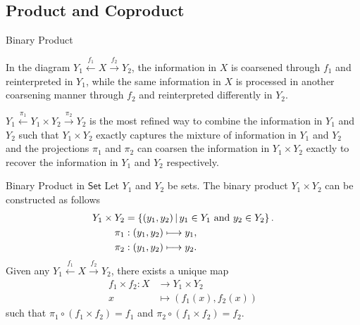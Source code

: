 \subsection{Product and Coproduct}
\begin{definition}{Binary Product}{}
    \begin{center}
    \end{center}
\end{definition}

In the diagram $Y_1\xleftarrow{f_1} X \xrightarrow{f_2} Y_2$, the information in $X$ is coarsened through $f_1$ and reinterpreted in $Y_1$, while the same information in $X$ is processed in another coarsening manner through $f_2$ and reinterpreted differently in $Y_2$.

$Y_1\xleftarrow{\pi_1}Y_1\times Y_2 \xrightarrow{\pi_2} Y_2$ is the most refined way to combine the information in $Y_1$ and $Y_2$ such that $Y_1\times Y_2$ exactly captures the mixture of information in $Y_1$ and $Y_2$ and the projections $\pi_1$ and $\pi_2$ can coarsen the information in $Y_1\times Y_2$ exactly to recover the information in $Y_1$ and $Y_2$ respectively.

\begin{example}{Binary Product in $\mathsf{Set}$}{}
    Let $Y_1$ and $Y_2$ be sets. The binary product $Y_1\times Y_2$ can be constructed as follows
    \begin{align*}
        Y_1\times Y_2&=\left\{(y_1,y_2) \,\middle\vert\, y_1\in Y_1\text{ and }y_2\in Y_2\right\}.\\
        \pi_1&:(y_1,y_2)\longmapsto y_1,\\
        \pi_2&:(y_1,y_2)\longmapsto y_2.
    \end{align*}
    Given any $Y_1\xleftarrow{f_1} X \xrightarrow{f_2} Y_2$, there exists a unique map 
    \begin{align*}
        f_1\times f_2 :X&\longrightarrow Y_1\times Y_2\\
        x&\longmapsto (f_1(x),f_2(x))
    \end{align*}
    such that $\pi_1\circ (f_1\times f_2)=f_1$ and $\pi_2\circ (f_1\times f_2)=f_2$.
\end{example}

